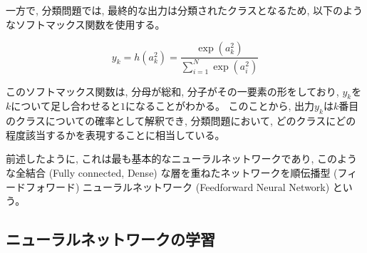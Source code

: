 一方で, 分類問題では, 最終的な出力は分類されたクラスとなるため, 以下のようなソフトマックス関数を使用する。

\begin{equation}
 y_k = h(a^2_k) = \frac{\exp{(a^2_k)}}{\sum^N_{i=1}\exp{(a^2_i)}}
\end{equation}

このソフトマックス関数は, 分母が総和, 分子がその一要素の形をしており, $y_k$を$k$について足し合わせると$1$になることがわかる。
このことから, 出力$y_k$は$k$番目のクラスについての確率として解釈でき, 分類問題において, どのクラスにどの程度該当するかを表現することに相当している。

前述したように, これは最も基本的なニューラルネットワークであり, このような全結合 (Fully connected, Dense) な層を重ねたネットワークを順伝播型 (フィードフォワード) ニューラルネットワーク (Feedforward Neural Network) という。


\subsection{ニューラルネットワークの学習} \label{DL:NN:TrainingofNN}


